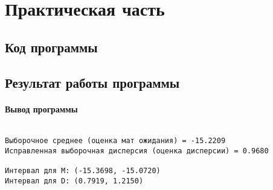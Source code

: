\chapter{Практическая часть}

\section{Код программы}




\section{Результат работы программы}

\subsubsection{Вывод программы}

\begin{lstlisting}

Выборочное среднее (оценка мат ожидания) = -15.2209
Исправленная выборочная дисперсия (оценка дисперсии) = 0.9680

Интервал для M: (-15.3698, -15.0720)
Интервал для D: (0.7919, 1.2150)
\end{lstlisting}


